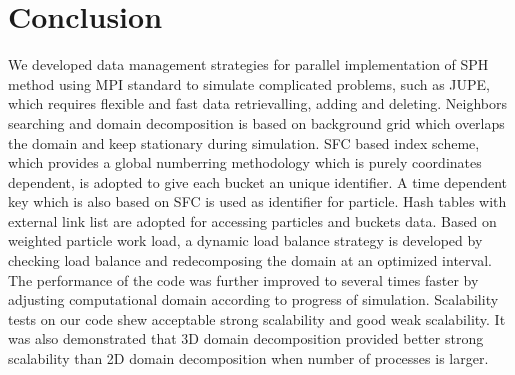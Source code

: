 \documentclass[conference,compsoc]{IEEEtran}
\begin{document}
\section{Conclusion}
We developed data management strategies for parallel implementation of SPH method using MPI standard to simulate complicated problems, such as JUPE, which requires flexible and fast data retrievalling, adding and deleting. Neighbors searching and domain decomposition is based on background grid which overlaps the domain and keep stationary during simulation. SFC based index scheme, which provides a global numberring methodology which is purely coordinates dependent, is adopted to give each bucket an unique identifier. A time dependent key which is also based on SFC is used as identifier for particle. 
Hash tables with external link list are adopted for accessing particles and buckets data. Based on weighted particle work load, a dynamic load balance strategy is developed by checking load balance and redecomposing the domain at an optimized interval. The performance of the code was further improved to several times faster by adjusting computational domain according to progress of simulation. 
Scalability tests on our code shew acceptable strong scalability and good weak scalability. It was also demonstrated that 3D domain decomposition provided better strong scalability than 2D domain decomposition when number of processes is larger.
%
%

\end{document}
